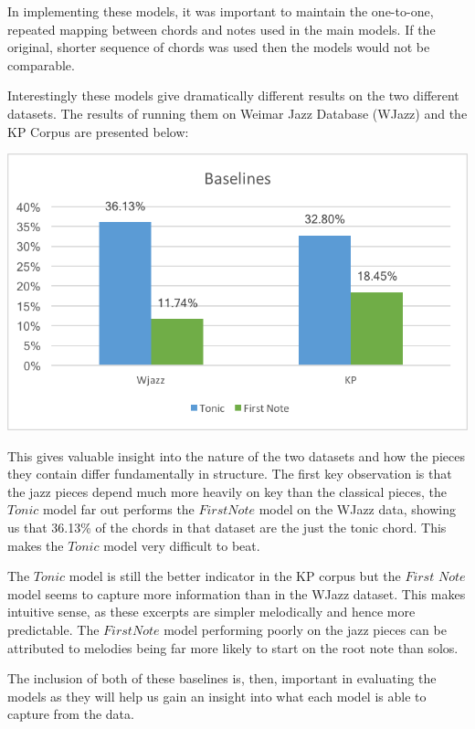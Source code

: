 \documentclass[bsc,singlespacing,logo, parskip, deptreport]{infthesis}
\begin{document}
In implementing these models, it was important to maintain the one-to-one, repeated mapping between chords and notes used in the main models. If the original, shorter sequence of chords was used then the models would not be comparable.

Interestingly these models give dramatically different results on the two different datasets. The results of running them on Weimar Jazz Database (WJazz) and the KP Corpus are presented below:

\begin{center}
\includegraphics{baselines}
\end{center}

This gives valuable insight into the nature of the two datasets and how the pieces they contain differ fundamentally in structure. The first key observation is that the jazz pieces depend much more heavily on key than the classical pieces, the $Tonic$ model far out performs the $First Note$ model on the WJazz data, showing us that 36.13\% of the chords in that dataset are the just the tonic chord. This makes the $Tonic$ model very difficult to beat.

The $Tonic$ model is still the better indicator in the KP corpus but the $First$ $Note$ model seems to capture more information than in the WJazz dataset. This makes intuitive sense, as these excerpts are simpler melodically and hence more predictable. The $First Note$ model performing poorly on the jazz pieces can be attributed to melodies being far more likely to start on the root note than solos.

The inclusion of both of these baselines is, then, important in evaluating the models as they will help us gain an insight into what each model is able to capture from the data.
\end{document}
